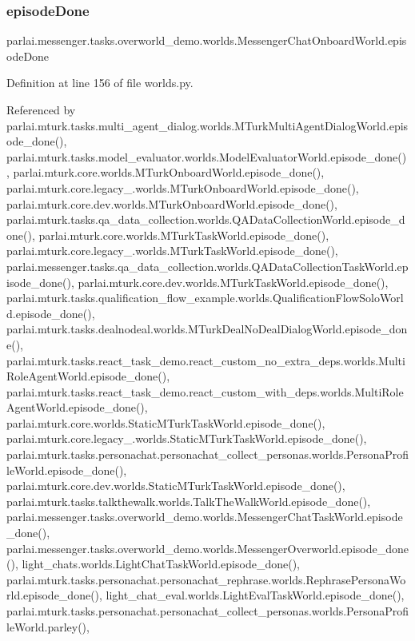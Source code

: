 \subsubsection{\texorpdfstring{episode\+Done}{episodeDone}}
{\footnotesize\ttfamily parlai.\+messenger.\+tasks.\+overworld\+\_\+demo.\+worlds.\+Messenger\+Chat\+Onboard\+World.\+episode\+Done}



Definition at line 156 of file worlds.\+py.



Referenced by parlai.\+mturk.\+tasks.\+multi\+\_\+agent\+\_\+dialog.\+worlds.\+M\+Turk\+Multi\+Agent\+Dialog\+World.\+episode\+\_\+done(), parlai.\+mturk.\+tasks.\+model\+\_\+evaluator.\+worlds.\+Model\+Evaluator\+World.\+episode\+\_\+done(), parlai.\+mturk.\+core.\+worlds.\+M\+Turk\+Onboard\+World.\+episode\+\_\+done(), parlai.\+mturk.\+core.\+legacy\+\_.\+worlds.\+M\+Turk\+Onboard\+World.\+episode\+\_\+done(), parlai.\+mturk.\+core.\+dev.\+worlds.\+M\+Turk\+Onboard\+World.\+episode\+\_\+done(), parlai.\+mturk.\+tasks.\+qa\+\_\+data\+\_\+collection.\+worlds.\+Q\+A\+Data\+Collection\+World.\+episode\+\_\+done(), parlai.\+mturk.\+core.\+worlds.\+M\+Turk\+Task\+World.\+episode\+\_\+done(), parlai.\+mturk.\+core.\+legacy\+\_.\+worlds.\+M\+Turk\+Task\+World.\+episode\+\_\+done(), parlai.\+messenger.\+tasks.\+qa\+\_\+data\+\_\+collection.\+worlds.\+Q\+A\+Data\+Collection\+Task\+World.\+episode\+\_\+done(), parlai.\+mturk.\+core.\+dev.\+worlds.\+M\+Turk\+Task\+World.\+episode\+\_\+done(), parlai.\+mturk.\+tasks.\+qualification\+\_\+flow\+\_\+example.\+worlds.\+Qualification\+Flow\+Solo\+World.\+episode\+\_\+done(), parlai.\+mturk.\+tasks.\+dealnodeal.\+worlds.\+M\+Turk\+Deal\+No\+Deal\+Dialog\+World.\+episode\+\_\+done(), parlai.\+mturk.\+tasks.\+react\+\_\+task\+\_\+demo.\+react\+\_\+custom\+\_\+no\+\_\+extra\+\_\+deps.\+worlds.\+Multi\+Role\+Agent\+World.\+episode\+\_\+done(), parlai.\+mturk.\+tasks.\+react\+\_\+task\+\_\+demo.\+react\+\_\+custom\+\_\+with\+\_\+deps.\+worlds.\+Multi\+Role\+Agent\+World.\+episode\+\_\+done(), parlai.\+mturk.\+core.\+worlds.\+Static\+M\+Turk\+Task\+World.\+episode\+\_\+done(), parlai.\+mturk.\+core.\+legacy\+\_.\+worlds.\+Static\+M\+Turk\+Task\+World.\+episode\+\_\+done(), parlai.\+mturk.\+tasks.\+personachat.\+personachat\+\_\+collect\+\_\+personas.\+worlds.\+Persona\+Profile\+World.\+episode\+\_\+done(), parlai.\+mturk.\+core.\+dev.\+worlds.\+Static\+M\+Turk\+Task\+World.\+episode\+\_\+done(), parlai.\+mturk.\+tasks.\+talkthewalk.\+worlds.\+Talk\+The\+Walk\+World.\+episode\+\_\+done(), parlai.\+messenger.\+tasks.\+overworld\+\_\+demo.\+worlds.\+Messenger\+Chat\+Task\+World.\+episode\+\_\+done(), parlai.\+messenger.\+tasks.\+overworld\+\_\+demo.\+worlds.\+Messenger\+Overworld.\+episode\+\_\+done(), light\+\_\+chats.\+worlds.\+Light\+Chat\+Task\+World.\+episode\+\_\+done(), parlai.\+mturk.\+tasks.\+personachat.\+personachat\+\_\+rephrase.\+worlds.\+Rephrase\+Persona\+World.\+episode\+\_\+done(), light\+\_\+chat\+\_\+eval.\+worlds.\+Light\+Eval\+Task\+World.\+episode\+\_\+done(), parlai.\+mturk.\+tasks.\+personachat.\+personachat\+\_\+collect\+\_\+personas.\+worlds.\+Persona\+Profile\+World.\+parley(), 